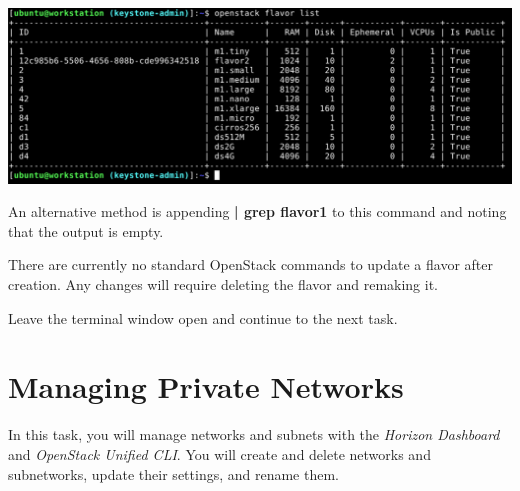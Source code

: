 \documentclass[letterpaper, 12pt]{article}
\begin{document}
\begin{enumerate}
\begin{labstep}
        \begin{center}
            \includegraphics[width=\linewidth]{images/part2/step12.png}
        \end{center}
    \end{labstep}

    \begin{tipbox}
        An alternative method is appending \textbf{| grep flavor1} to this command and noting that the output is empty.
    \end{tipbox}

    \begin{notebox}
        There are currently no standard OpenStack commands to update a flavor after creation.
        Any changes will require deleting the flavor and remaking it.
    \end{notebox}

    \begin{labstep}
        Leave the terminal window open and continue to the next task.
    \end{labstep}

\end{enumerate}

\section{Managing Private Networks}\label{sec:managing_private_networks}
In this task, you will manage networks and subnets with the \textit{Horizon Dashboard} and \textit{OpenStack Unified CLI}.
You will create and delete networks and subnetworks, update their settings, and rename them.
\end{document}
